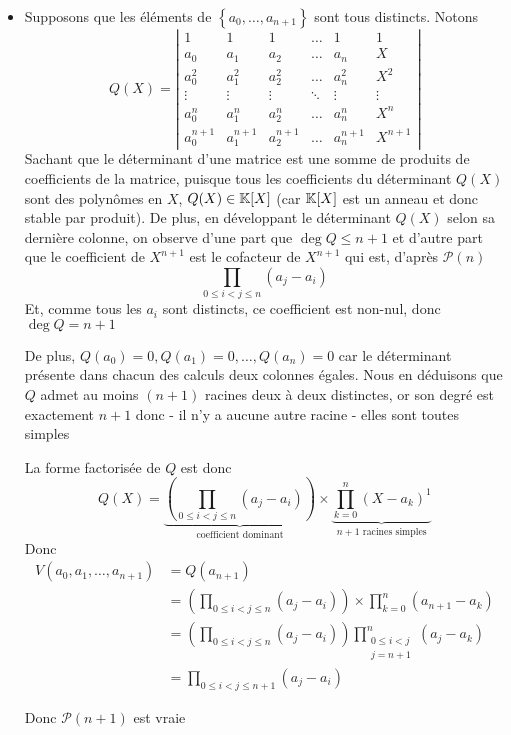 \documentclass{article}
\begin{document}
\begin{question_kholle}
\begin{itemize}[label=$\lozenge$]
\begin{itemize}
		    \item Supposons que les éléments de $\left\{ a_{0} ,\dots, a_{n+1} \right\}$ sont tous distincts.
			Notons
			$$
			Q(X) = \left| \begin{matrix}
			1 & 1 & 1 & \dots  & 1 & 1 \\
			a_{0} & a_{1} & a_{2} & \dots & a_{n} & X \\
			a_{0}^{2} & a_{1}^{2} & a_{2}^{2} & \dots & a_{n}^{2} & X^{2} \\
			\vdots & \vdots & \vdots & \ddots & \vdots & \vdots \\
			a_{0}^{n} & a_{1}^{n} & a_{2}^{n} & \dots & a_{n}^{n} & X^{n} \\
			a_{0}^{n+1} & a_{1}^{n+1} & a_{2}^{n+1} & \dots & a_{n}^{n+1} & X^{n+1}
			\end{matrix} \right|
			$$
			Sachant que le déterminant d'une matrice est une somme de produits de coefficients de la matrice, puisque tous les coefficients du déterminant $Q(X)$ sont des polynômes en $X$, $Q(X) \in \mathbb K[X]$ (car $\mathbb K[X]$ est un anneau et donc stable par produit).
			De plus, en développant le déterminant $Q(X)$ selon sa dernière colonne, on observe d'une part que $\deg Q \leqslant n+1$ et d'autre part que le coefficient de $X^{n+1}$ est le cofacteur de $X^{n+1}$ qui est, d'après $\mathcal{P}(n)$
			$$
			\prod_{0\leqslant i<j \leqslant n}(a_{j}-a_{i})
			$$
			Et, comme tous les $a_{i}$ sont distincts, ce coefficient est non-nul, donc $\deg Q=n+1$
			
			De plus, $Q(a_{0})=0, Q(a_{1})=0, \dots, Q(a_{n})=0$ car le déterminant présente dans chacun des calculs deux colonnes égales. Nous en déduisons que $Q$ admet au moins $(n+1)$ racines deux à deux distinctes, or son degré est exactement $n+1$ donc
			- il n'y a aucune autre racine
			- elles sont toutes simples
			
			La forme factorisée de $Q$ est donc
			$$
			Q(X)=\underbrace{ \left( \prod_{0\leqslant i < j \leqslant n} (a_{j}-a_{i})\right) }_{ \text{coefficient dominant} } \times \underbrace{ \prod_{k=0}^{n}(X-a_{k})^{1} }_{ n+1 \text{ racines simples} }
			$$
			Donc 
			\begin{align*}
				V(a_{0}, a_{1},\dots, a_{n+1})&=Q(a_{n+1}) \\
				&=  \left( \prod_{0\leqslant i < j \leqslant n} (a_{j}-a_{i})\right) \times  \prod_{k=0}^{n}(a_{n+1}-a_{k})  \\
				&= \left( \prod_{0\leqslant i < j \leqslant n} (a_{j}-a_{i})\right) \prod_{\substack{0\leqslant i<j \\ j=n+1}}^{n}(a_{j}-a_{k}) \\
				&= \prod_{0\leqslant i < j \leqslant n+1} (a_{j}-a_{i})
			\end{align*}
			
			Donc $\mathcal{P}(n+1)$ est vraie
		\end{itemize}
	\end{itemize}
\end{question_kholle}
\end{document}
